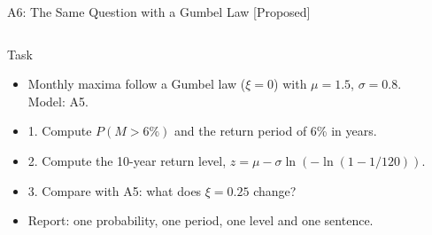 \begin{frame}{A6: The Same Question with a Gumbel Law [Proposed]}
\propsub
\itemsize{\scriptsize}
\begin{columns}[T]
\begin{column}{\taskw}
\begin{block}{Task}
\begin{itemize}
    \item Monthly maxima follow a Gumbel law ($\xi = 0$) with $\mu = 1.5$, $\sigma = 0.8$. Model: A5.
    \item 1. Compute $P(M > 6\%)$ and the return period of 6\% in years.
    \item 2. Compute the 10-year return level, $z = \mu - \sigma\ln(-\ln(1 - 1/120))$.
    \item 3. Compare with A5: what does $\xi = 0.25$ change?
    \item Report: one probability, one period, one level and one sentence.
\end{itemize}
\end{block}
\end{column}
\begin{column}{\solw}
\end{column}
\end{columns}
\end{frame}

